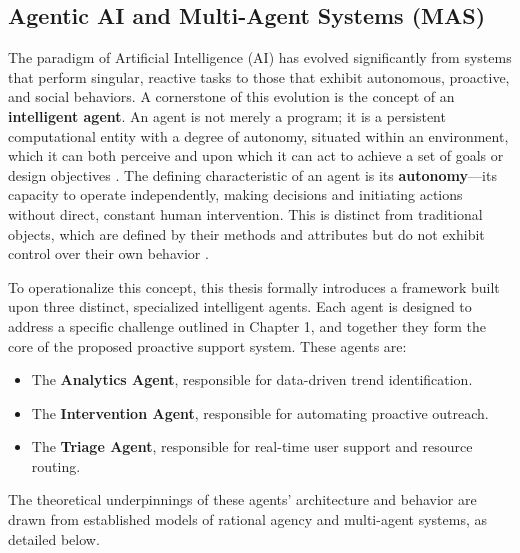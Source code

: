\subsection{Agentic AI and Multi-Agent Systems (MAS)}
\label{subsec:agentic_ai}

The paradigm of Artificial Intelligence (AI) has evolved significantly from systems that perform singular, reactive tasks to those that exhibit autonomous, proactive, and social behaviors. A cornerstone of this evolution is the concept of an \textbf{intelligent agent}. An agent is not merely a program; it is a persistent computational entity with a degree of autonomy, situated within an environment, which it can both perceive and upon which it can act to achieve a set of goals or design objectives \cite{FIND_CITATION_PLEASE}. The defining characteristic of an agent is its \textbf{autonomy}—its capacity to operate independently, making decisions and initiating actions without direct, constant human intervention. This is distinct from traditional objects, which are defined by their methods and attributes but do not exhibit control over their own behavior \cite{FIND_CITATION_PLEASE}.

To operationalize this concept, this thesis formally introduces a framework built upon three distinct, specialized intelligent agents. Each agent is designed to address a specific challenge outlined in Chapter 1, and together they form the core of the proposed proactive support system. These agents are:
\begin{itemize}
    \item The \textbf{Analytics Agent}, responsible for data-driven trend identification.
    \item The \textbf{Intervention Agent}, responsible for automating proactive outreach.
    \item The \textbf{Triage Agent}, responsible for real-time user support and resource routing.
\end{itemize}

The theoretical underpinnings of these agents' architecture and behavior are drawn from established models of rational agency and multi-agent systems, as detailed below.

